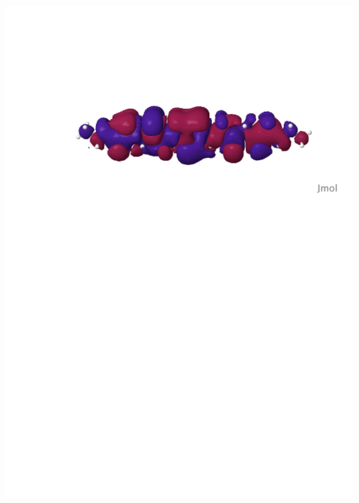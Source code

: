 \begin{frame}
\begin{columns}
\begin{column}[b]{0.48\linewidth}
    \includegraphics[scale=0.25, clip, viewport = 80 560 600 700]{figures/can_orb_1.pdf}\\

\end{column}
\end{columns}
\end{frame}

